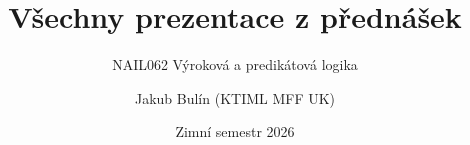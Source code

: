 \documentclass[handout]{beamer}
\title{Všechny prezentace z přednášek}
\subtitle{NAIL062 Výroková a predikátová logika}
\author{Jakub Bulín (KTIML MFF UK)}
\date{Zimní semestr 2026}
\begin{document}
\maketitle

\renewcommand{\maketitle}{}













\end{document}
